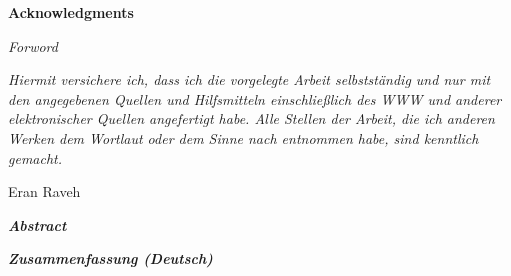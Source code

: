 \vspace*{9cm}
\begin{center}
\end{center}
\newpage

\vspace*{3cm}
\begin{center}
    {\textbf{\huge Acknowledgments}}\\[0.3cm]
    \Large
\end{center}
\newpage

{\calligra \Huge \textit{Forword}}
\clearpage        

\begin{multicols}{2}
    \vspace*{\textheight}
    \columnbreak
    \vspace*{3cm}
    \Large{\textit{Hiermit versichere ich, dass ich die vorgelegte Arbeit selbstst{\"a}ndig und nur mit den angegebenen Quellen und Hilfsmitteln einschließlich des WWW und anderer elektronischer Quellen angefertigt habe.
            Alle Stellen der Arbeit, die ich anderen Werken dem Wortlaut oder dem Sinne nach entnommen habe, sind kenntlich gemacht.}}
    \vspace{0.55cm}
    \begin{flushright}
		{Eran Raveh}
    \end{flushright}
\end{multicols}
\cleardoublepage

\begin{center}
    \vspace*{3.3cm}
    \textit{\textbf{\huge Abstract}}\\[0.3cm]
    \Large
\end{center}
\clearpage

\begin{center}
     \vspace*{3.3cm}
     \textit{\textbf{\huge Zusammenfassung (Deutsch)}}\\[0.3cm]
     \Large
\end{center}
\cleardoublepage


